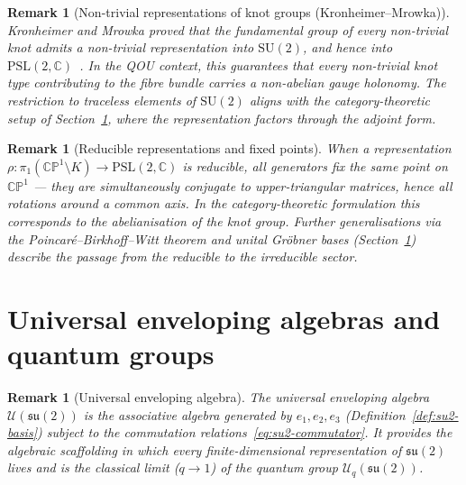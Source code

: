 \documentclass[12pt,a4paper]{report}
\newtheorem{remark}[theorem]{Remark}
\begin{document}
\begin{remark}[Non-trivial representations of knot groups
  {\normalfont(Kronheimer--Mrowka)}]
\label{rem:kronheimer-mrowka}
Kronheimer and Mrowka proved that the fundamental group of every
non-trivial knot admits a non-trivial representation into
$\mathrm{SU}(2)$, and hence into
$\mathrm{PSL}(2,\mathbb{C})$~\cite{KronheimerMrowka2004}.  In the
QOU context, this guarantees that every non-trivial knot type
contributing to the fibre bundle carries a non-abelian gauge holonomy.
The restriction to traceless elements of $\mathrm{SU}(2)$ aligns with
the category-theoretic setup of Section~\ref{sec:enveloping-algebras},
where the representation factors through the adjoint form.
\end{remark}

\begin{remark}[Reducible representations and fixed points]
\label{rem:reducible-reps}
When a representation
$\rho\colon\pi_1(\mathbb{CP}^1\setminus K)\to\mathrm{PSL}(2,\mathbb{C})$
is reducible, all generators fix the same point on $\mathbb{CP}^1$ ---
they are simultaneously conjugate to upper-triangular matrices, hence
all rotations around a common axis.  In the category-theoretic
formulation this corresponds to the abelianisation of the knot group.
Further generalisations via the Poincar\'e--Birkhoff--Witt theorem and
unital Gr\"obner bases (Section~\ref{sec:enveloping-algebras}) describe
the passage from the reducible to the irreducible sector.
\end{remark}



\section{Universal enveloping algebras and quantum groups}
\label{sec:enveloping-algebras}

\begin{remark}[Universal enveloping algebra]
\label{rem:enveloping-algebra}
The universal enveloping algebra
$\mathcal{U}(\mathfrak{su}(2))$ is the associative algebra generated by
$e_1,e_2,e_3$ (Definition~\ref{def:su2-basis}) subject to the
commutation relations~\eqref{eq:su2-commutator}.  It provides the
algebraic scaffolding in which every finite-dimensional representation of
$\mathfrak{su}(2)$ lives and is the classical limit ($q\to 1$) of the
quantum group $\mathcal{U}_q(\mathfrak{su}(2))$.
\end{remark}
\end{document}
